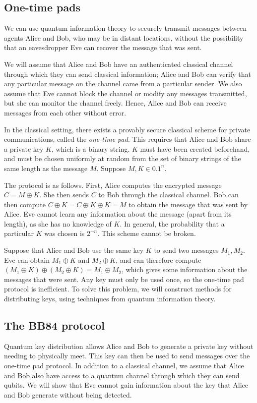 \subsection{One-time pads}
We can use quantum information theory to securely transmit messages between agents Alice and Bob, who may be in distant locations, without the possibility that an eavesdropper Eve can recover the message that was sent.

We will assume that Alice and Bob have an authenticated classical channel through which they can send classical information; Alice and Bob can verify that any particular message on the channel came from a particular sender.
We also assume that Eve cannot block the channel or modify any messages transmitted, but she can monitor the channel freely.
Hence, Alice and Bob can receive messages from each other without error.

In the classical setting, there exists a provably secure classical scheme for private communications, called the \emph{one-time pad}.
This requires that Alice and Bob share a private key \( K \), which is a binary string.
\( K \) must have been created beforehand, and must be chosen uniformly at random from the set of binary strings of the same length as the message \( M \).
Suppose \( M, K \in \qty{0,1}^n \).

The protocol is as follows.
First, Alice computes the encrypted message \( C = M \oplus K \).
She then sends \( C \) to Bob through the classical channel.
Bob can then compute \( C \oplus K = C \oplus K \oplus K = M \) to obtain the message that was sent by Alice.
Eve cannot learn any information about the message (apart from its length), as she has no knowledge of \( K \).
In general, the probability that a particular \( K \) was chosen is \( 2^{-n} \).
This scheme cannot be broken.

Suppose that Alice and Bob use the same key \( K \) to send two messages \( M_1, M_2 \).
Eve can obtain \( M_1 \oplus K \) and \( M_2 \oplus K \), and can therefore compute \( (M_1 \oplus K) \oplus (M_2 \oplus K) = M_1 \oplus M_2 \), which gives some information about the messages that were sent.
Any key must only be used once, so the one-time pad protocol is inefficient.
To solve this problem, we will construct methods for distributing keys, using techniques from quantum information theory.

\subsection{The BB84 protocol}
Quantum key distribution allows Alice and Bob to generate a private key without needing to physically meet.
This key can then be used to send messages over the one-time pad protocol.
In addition to a classical channel, we assume that Alice and Bob also have access to a quantum channel through which they can send qubits.
We will show that Eve cannot gain information about the key that Alice and Bob generate without being detected.


